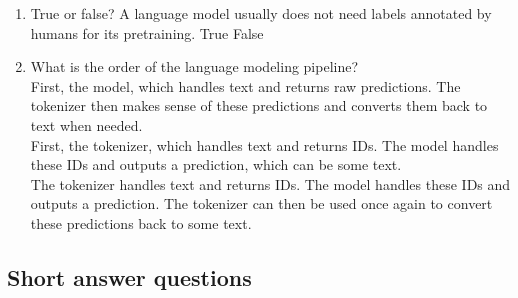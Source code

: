 \begin{enumerate}
    \item True or false? A language model usually does not need labels annotated by humans for its pretraining.
        \hspace{1cm}\checkmark{} True
        \hspace{1cm}\choice{} False \\ 
        \solution{}

    \item What is the order of the language modeling pipeline? \\ 
        \hspace{1cm}\choice{} First, the model, which handles text and returns raw predictions. The tokenizer then makes sense of these predictions and converts them back to text when needed.  \\ 
        \hspace{1cm}\choice{} First, the tokenizer, which handles text and returns IDs. The model handles these IDs and outputs a prediction, which can be some text. \\ 
        \hspace{1cm}\checkmark{} The tokenizer handles text and returns IDs. The model handles these IDs and outputs a prediction. The tokenizer can then be used once again to convert these predictions back to some text. \\ 
        \solution{}

\end{enumerate}

\subsection{Short answer questions}

